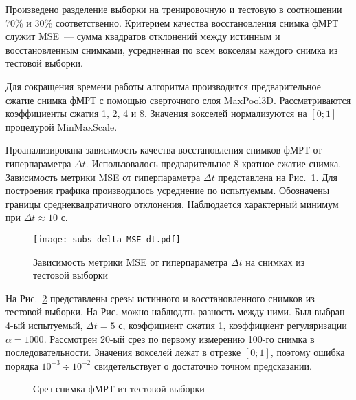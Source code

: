 \documentclass[a4paper, 12pt]{article}
\begin{document}
	Произведено разделение выборки на тренировочную и тестовую в соотношении 70\% и 30\% соответственно.
	Критерием качества восстановления снимка фМРТ служит MSE~--- сумма квадратов отклонений 
	между истинным и восстановленным снимками, усредненная по всем вокселям каждого снимка
	из тестовой выборки.

	Для сокращения времени работы алгоритма производится предварительное сжатие снимка фМРТ
	с помощью сверточного слоя MaxPool3D. Рассматриваются коэффициенты сжатия 1, 2, 4 и 8.
	Значения вокселей нормализуются на $[0; 1]$ процедурой MinMaxScale.

	Проанализирована зависимость качества восстановления снимков фМРТ от гиперпараметра $\Delta t$.
	Использовалось предварительное 8-кратное сжатие снимка.
	Зависимость метрики MSE от гиперпараметра $\Delta t$ представлена на Рис.~\ref{fig:mse-dt}.
	Для построения графика производилось усреднение по испытуемым.
	Обозначены границы среднеквадратичного отклонения. 
	Наблюдается характерный минимум при $\Delta t \approx 10 \text{ с}$.
	
	\begin{figure}[h!]
		\centering
		\texttt{[image: subs\_delta\_MSE\_dt.pdf]}
		\caption{Зависимость метрики MSE от гиперпараметра $\Delta t$ на снимках из тестовой выборки}
		\label{fig:mse-dt}
	\end{figure}
	
	На Рис.~\ref*{fig:4} представлены срезы истинного и восстановленного снимков из 
	тестовой выборки. На Рис. можно наблюдать разность между ними.
	Был выбран 4-ый испытуемый, $\Delta t = 5 \text{ с}$, коэффициент сжатия 1, коэффициент регуляризации
	$\alpha = 1000$. Рассмотрен 20-ый срез по первому измерению 100-го снимка в последовательности.
	Значения вокселей лежат в отрезке $[0; 1]$, поэтому ошибка порядка $10^{-3} \div 10^{-2}$
	свидетельствует о достаточно точном предсказании.

	\begin{figure}[h!]
		\centering
		\hfill
		\hfill
		\caption{Срез снимка фМРТ из тестовой выборки}
		\label{fig:4}
	\end{figure}
\end{document}
